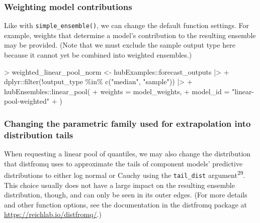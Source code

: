 \documentclass[
  letterpaper,
  DIV=11,
  numbers=noendperiod]{scrartcl}
\newenvironment{Shaded}{\begin{snugshade}}{\end{snugshade}}
\newcommand{\AttributeTok}[1]{\textcolor[rgb]{0.40,0.45,0.13}{#1}}
\newcommand{\FunctionTok}[1]{\textcolor[rgb]{0.28,0.35,0.67}{#1}}
\newcommand{\NormalTok}[1]{\textcolor[rgb]{0.00,0.23,0.31}{#1}}
\newcommand{\OtherTok}[1]{\textcolor[rgb]{0.00,0.23,0.31}{#1}}
\newcommand{\SpecialCharTok}[1]{\textcolor[rgb]{0.37,0.37,0.37}{#1}}
\newcommand{\StringTok}[1]{\textcolor[rgb]{0.13,0.47,0.30}{#1}}
\begin{document}
\subsubsection{Weighting model
contributions}\label{weighting-model-contributions-1}

Like with \texttt{simple\_ensemble()}, we can change the default
function settings. For example, weights that determine a model's
contribution to the resulting ensemble may be provided. (Note that we
must exclude the sample output type here because it cannot yet be
combined into weighted ensembles.)

\begin{Shaded}
\begin{Highlighting}[]
\SpecialCharTok{\textgreater{}}\NormalTok{   weighted\_linear\_pool\_norm }\OtherTok{\textless{}{-}}\NormalTok{ hubExamples}\SpecialCharTok{::}\NormalTok{forecast\_outputs }\SpecialCharTok{|\textgreater{}}
\SpecialCharTok{+}\NormalTok{     dplyr}\SpecialCharTok{::}\FunctionTok{filter}\NormalTok{(}\SpecialCharTok{!}\NormalTok{output\_type }\SpecialCharTok{\%in\%} \FunctionTok{c}\NormalTok{(}\StringTok{"median"}\NormalTok{, }\StringTok{"sample"}\NormalTok{)) }\SpecialCharTok{|\textgreater{}}
\SpecialCharTok{+}\NormalTok{     hubEnsembles}\SpecialCharTok{::}\FunctionTok{linear\_pool}\NormalTok{(}
\SpecialCharTok{+}       \AttributeTok{weights =}\NormalTok{ model\_weights,}
\SpecialCharTok{+}       \AttributeTok{model\_id =} \StringTok{"linear{-}pool{-}weighted"}
\SpecialCharTok{+}\NormalTok{     )}
\end{Highlighting}
\end{Shaded}

\subsubsection{Changing the parametric family used for extrapolation
into distribution
tails}\label{changing-the-parametric-family-used-for-extrapolation-into-distribution-tails}

When requesting a linear pool of quantiles, we may also change the
distribution that {distfromq} uses to approximate the tails of component
models' predictive distributions to either log normal or Cauchy using
the \texttt{tail\_dist} argument\textsuperscript{29}. This choice
usually does not have a large impact on the resulting ensemble
distribution, though, and can only be seen in its outer edges. (For more
details and other function options, see the documentation in the
{distfromq} package at \url{https://reichlab.io/distfromq/}.)
\end{document}
